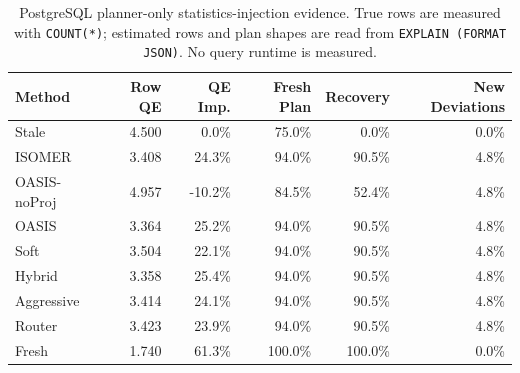 \begin{table}[t]
  \centering
  \small
  \caption{PostgreSQL planner-only statistics-injection evidence. True rows are measured with \texttt{COUNT(*)}; estimated rows and plan shapes are read from \texttt{EXPLAIN (FORMAT JSON)}. No query runtime is measured.}
  \label{tab:postgres_planner_stats_injection}
  \setlength{\tabcolsep}{4pt}
  \begin{tabular}{lrrrrr}
    \toprule
    Method & Row QE & QE Imp. & Fresh Plan & Recovery & New Deviations \\
    \midrule
    Stale & 4.500 & 0.0\% & 75.0\% & 0.0\% & 0.0\% \\
    ISOMER & 3.408 & 24.3\% & 94.0\% & 90.5\% & 4.8\% \\
    OASIS-noProj & 4.957 & -10.2\% & 84.5\% & 52.4\% & 4.8\% \\
    OASIS & 3.364 & 25.2\% & 94.0\% & 90.5\% & 4.8\% \\
    Soft & 3.504 & 22.1\% & 94.0\% & 90.5\% & 4.8\% \\
    Hybrid & 3.358 & 25.4\% & 94.0\% & 90.5\% & 4.8\% \\
    Aggressive & 3.414 & 24.1\% & 94.0\% & 90.5\% & 4.8\% \\
    Router & 3.423 & 23.9\% & 94.0\% & 90.5\% & 4.8\% \\
    Fresh & 1.740 & 61.3\% & 100.0\% & 100.0\% & 0.0\% \\
    \bottomrule
  \end{tabular}
\end{table}
